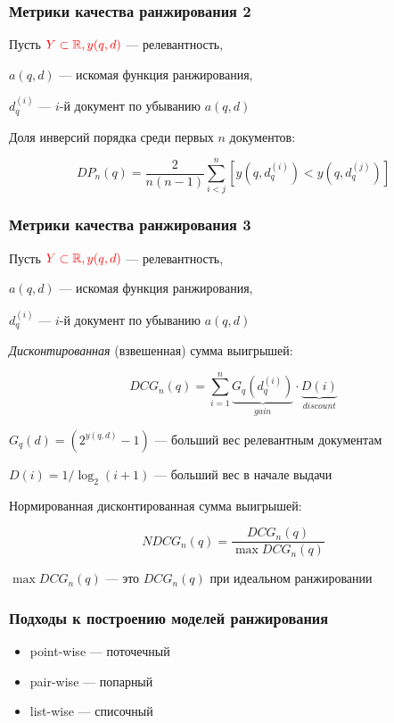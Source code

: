 \documentclass[fullscreen=true, bookmarks=true, hyperref={pdfencoding=unicode}]{beamer}
\begin{document}
\begin{frame}
  \frametitle{Метрики качества ранжирования 2}

  Пусть $\color{red}{Y \subset \mathbb{R}}, y(q, d)$ — релевантность,

  $a(q, d)$ — искомая функция ранжирования,

  $d_q^{(i)}$ — $i$-й документ по убыванию $a(q, d)$

  \vspace{1cm}
  Доля инверсий порядка среди первых $n$ документов:

  $$ DP_n (q) = \frac{2}{n(n-1)} \sum\limits_{i<j}^n \left[y(q, d_q^{(i)}) < y(q, d_q^{(j)}) \right]$$
\end{frame}


\begin{frame}
  \frametitle{Метрики качества ранжирования 3}

  Пусть $\color{red}{Y \subset \mathbb{R}}, y(q, d)$ — релевантность,

  $a(q, d)$ — искомая функция ранжирования,

  $d_q^{(i)}$ — $i$-й документ по убыванию $a(q, d)$

  {\it Дисконтированная} (взвешенная) сумма выигрышей:

  $$ DCG_n(q) = \sum\limits_{i=1}^n \underbrace{G_q(d_q^{(i)})}_{gain} \cdot \underbrace{D(i)}_{discount}$$

  $G_q(d) = (2^{y(q, d)}-1)$ — больший вес релевантным документам

  $D(i) = 1 / \log_2(i+1)$ — больший вес в начале выдачи

  Нормированная дисконтированная сумма выигрышей:

  $$ NDCG_n(q) = \frac{DCG_n(q)}{\max DCG_n(q)}$$

  $\max DCG_n(q)$ — это $DCG_n(q)$ при идеальном ранжировании
\end{frame}


\begin{frame}
  \frametitle{Подходы к построению моделей ранжирования}

   \begin{itemize}
     \item point-wise — поточечный
     \item pair-wise — попарный
     \item list-wise — списочный
   \end{itemize}
\end{frame}
\end{document}
